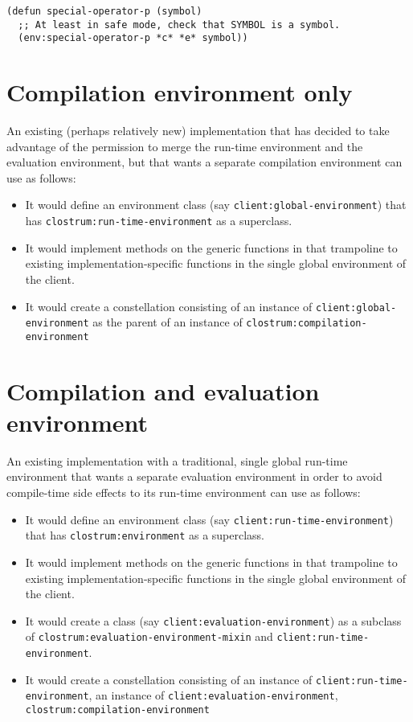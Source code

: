 \begin{verbatim}
(defun special-operator-p (symbol)
  ;; At least in safe mode, check that SYMBOL is a symbol.
  (env:special-operator-p *c* *e* symbol))
\end{verbatim}

\section{Compilation environment only}

An existing (perhaps relatively new) \commonlisp{} implementation that
has decided to take advantage of the permission to merge the run-time
environment and the evaluation environment, but that wants a separate
compilation environment can use \sysname{} as follows:

\begin{itemize}
\item It would define an environment class  (say
  \texttt{client:global-environment}) that has
  \texttt{clostrum:run-time-environment} as a superclass.
\item It would implement methods on the generic functions in
   that trampoline to existing
  implementation-specific functions in the single global environment
  of the client.
\item It would create a constellation consisting of an instance of
  \texttt{client:global-environment} as the parent of an instance of
  \texttt{clostrum:compilation-environment}
\end{itemize}

\section{Compilation and evaluation environment}

An existing \commonlisp{} implementation with a traditional, single
global run-time environment that wants a separate evaluation
environment in order to avoid compile-time side effects to its
run-time environment can use \sysname{} as follows:

\begin{itemize}
\item It would define an environment class  (say
  \texttt{client:run-time-environment}) that has
  \texttt{clostrum:environment} as a superclass.
\item It would implement methods on the generic functions in
   that trampoline to existing
  implementation-specific functions in the single global environment
  of the client.
\item It would create a class (say
  \texttt{client:evaluation-environment}) as a subclass of
  \texttt{clostrum:evaluation-environment-mixin} and
  \texttt{client:run-time-environment}.
\item It would create a constellation consisting of an instance of
  \texttt{client:run-time-environment}, an instance of
  \texttt{client:evaluation-environment},
  \texttt{clostrum:compilation-environment}
\end{itemize}
